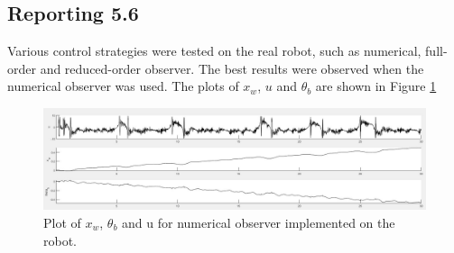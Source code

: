 \documentclass[11pt]{article}
\begin{document}
\subsection*{Reporting 5.6}

Various control strategies were tested on the real robot, such as numerical, full-order and reduced-order observer. The best results were observed when the numerical observer was used. The plots of $x_w$, $u$ and $\theta_b$ are shown in Figure \ref{fig:plot4} 

\begin{figure}[ht]
	\centering
	\includegraphics[width=1\linewidth]{Images/robot_numerical.JPG}
	\caption{Plot of $x_w$, $\theta_b$ and u for numerical observer implemented on the robot.}
	\label{fig:plot4}
\end{figure}
\end{document}
